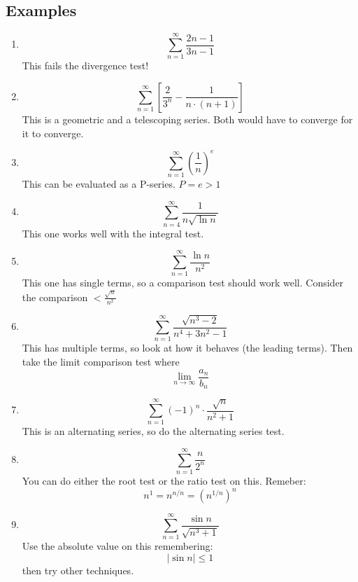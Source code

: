 \documentclass{article}
\begin{document}
    \subsection{Examples}
        \begin{enumerate}
            \item \[\sum_{n = 1}^{\infty} \frac{2n-1}{3n-1} \]
            This fails the divergence test!
            \item \[\sum_{n = 1}^{\infty} \left[ \frac{2}{3^n} - \frac{1}{n \cdot (n+1)} \right]\]
            This is a geometric and a telescoping series. Both would have to converge for it to converge.
            \item \[\sum_{n = 1}^{\infty} \left(\frac{1}{n}\right)^e \]
            This can be evaluated as a P-series. \(P = e > 1\)
            \item \[\sum_{n = 4}^{\infty} \frac{1}{n \sqrt{\ln n}} \]
            This one works well with the integral test.
            \item \[\sum_{n = 1}^{\infty} \frac{\ln n}{n^2} \]
            This one has single terms, so a comparison test should work well.
            Consider the comparison \(< \frac{\sqrt{n}}{n^2}\)
            \item \[\sum_{n = 1}^{\infty} \frac{\sqrt{n^3 - 2}}{n^4+3n^2-1} \]
            This has multiple terms, so look at how it behaves (the leading terms).
            Then take the limit comparison test where \[\lim_{n \to \infty} \frac{a_n}{b_n}\]
            \item \[\sum_{n = 1}^{\infty} (-1)^n \cdot \frac{\sqrt{n}}{n^2 + 1} \]
            This is an alternating series, so do the alternating series test.
            \item \[\sum_{n = 1}^{\infty} \frac{n}{2^n} \]
            You can do either the root test or the ratio test on this.
            Remeber: \[n^1 = n^{n/n} = \left(n^{1/n}\right)^n\]
            \item \[\sum_{n = 1}^{\infty} \frac{\sin n}{\sqrt{n^3 + 1}} \]
            Use the absolute value on this remembering: \[|\sin n| \leq 1\] then try other techniques.
        \end{enumerate}
\end{document}
